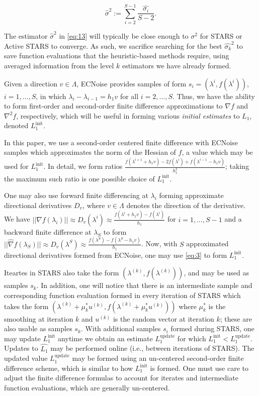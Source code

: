\documentclass{amsart}
\begin{document}
\begin{equation} \label{eq:15}
 \hat{\sigma}^2:=\sum_{i=2}^{S-1}\frac{\hat{\sigma_i}}{S-2}.
\end{equation}  

The estimator $\hat{\sigma}^2$ in \eqref{eq:13} will typically be close enough to $\sigma^2$ for STARS or Active STARS to converge. As such, we sacrifice searching for the best $\hat{\sigma_k}^2$ to save function evaluations that the heuristic-based methods require, using averaged information from the level $k$ estimators we have already formed.

Given a direction $v \in \Lambda$, ECNoise provides samples of form $s_i=(\lambda^i, f(\lambda^i))$, $i=1,\ldots, S$, in which $\lambda_i-\lambda_{i-1}=h_1v$ for all $i=2,\ldots, S.$ Thus, we have the ability to form first-order and second-order finite difference approximations to $\nabla f$ and $\nabla^2 f$, respectively, which will be useful in forming various \textit{initial estimates} to $L_1$, denoted $L_1^\text{init}$. 

In this paper, we use a second-order centered finite difference with ECNoise samples which approximates the norm of the Hessian of $f$, a value which may be used for $L_1^\text{init}$. In detail, we form ratios $\frac{f(\lambda^{i+1}+h_1 v)-2f(\lambda^{i})+f(\lambda^{i-1}-h_1 v)}{h_1^2}$; taking the maximum such ratio is one possible choice of $L_1^\text{init}$.

One may also use forward finite differencing at $\lambda_i$ forming approximate directional derivatives $D_v$, where $v \in \Lambda$ denotes the direction of the derivative.  We have $||\hat{\nabla }f(\lambda_i)||\approx D_v (\lambda^i)\approx\frac{f(\lambda^{i}+h_1 v)-f(\lambda^{i})}{h_1}$ for $i=1,\ldots,S-1$ and a backward finite difference at $\lambda_S$ to form $||\hat{\nabla }f(\lambda_S)|| \approx D_v(\lambda^S)\approx\frac{f(\lambda^{S})-f(\lambda^{S}-h_1 v)}{h_1}$. Now, with $S$ approximated directional derivatives formed from ECNoise, one may use \eqref{eq:3} to form $L_1^\text{init}$.

Iteartes in STARS also take the form $(\lambda^{(k)}, f(\lambda^{(k)}))$, and may be used as samples $s_k$. In addition, one will notice that there is an intermediate sample and corresponding function evaluation formed in every iteration of STARS which takes the form $(\lambda^{(k)}+\mu^*_k u^{(k)}, f(\lambda^{(k)}+\mu^*_k u^{(k)}))$ where $\mu^*_k$ is the smoothing at iteration $k$ and $u^{(k)}$ is the random vector at iteration $k$; these are also usable as samples $s_k$. With additional samples $s_i$ formed during STARS, one may update $L_1^\text{init}$ anytime we obtain an estimate $L_1^\text{update}$ for which $L_1^\text{init}<L_1^\text{update}$. Updates to $\hat{L_1}$ may be performed online (i.e., between iterations of STARS). The updated value $L_1^\text{update}$ may be formed using an un-centered second-order finite difference scheme, which is similar to how $L_1^\text{init}$ is formed. One must use care to adjust the finite difference formulas to account for iterates and intermediate function evaluations, which are generally un-centered.
\end{document}
